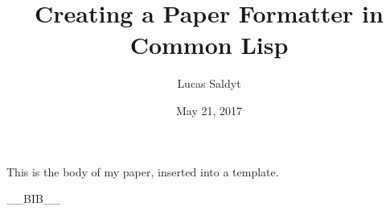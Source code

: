 \documentclass{article}
\title{ Creating a Paper Formatter in Common Lisp}
\date{ May 21, 2017}
\author{ Lucas Saldyt}
\begin{document}
\maketitle
{}
\newpage
\tableofcontents
\newpage
{}


This is the body of my paper, inserted into a template.

\begin{thebibliography}{11}
        __BIB__
\end{thebibliography}
\end{document}
